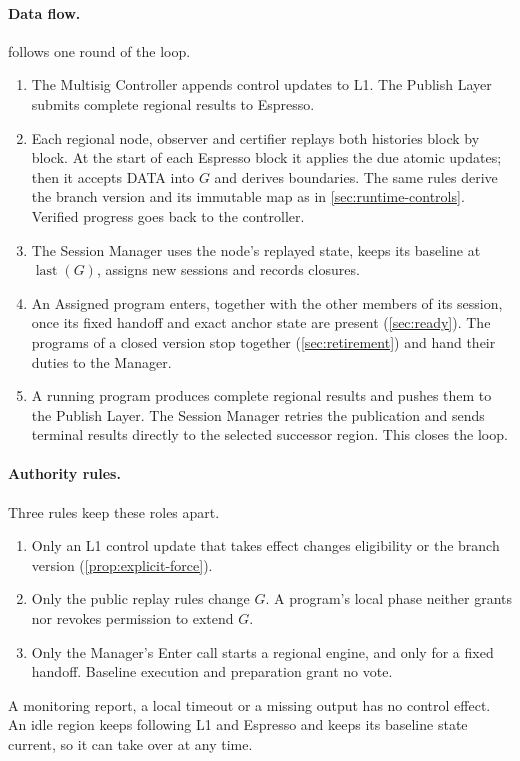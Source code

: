 \documentclass[11pt,a4paper]{article}
\begin{document}
\paragraph{Data flow.}
 follows one round of the loop.
\begin{enumerate}[label=(\arabic*)]
\item The Multisig Controller appends control updates to L1. The Publish
Layer submits complete regional results to Espresso.
\item Each regional node, observer and certifier replays both histories
block by block. At the start of each Espresso block it applies the due
atomic updates; then it accepts DATA into $G$ and derives boundaries.
The same rules derive the branch version and its immutable map as in
\cref{sec:runtime-controls}. Verified progress goes back to the
controller.
\item The Session Manager uses the node's replayed state, keeps its
baseline at $\operatorname{last}(G)$, assigns new sessions and records
closures.
\item An Assigned program enters, together with the other members of
its session, once its fixed handoff and exact anchor state are present
(\cref{sec:ready}). The programs of a closed version stop together
(\cref{sec:retirement}) and hand their duties to the Manager.
\item A running program produces complete regional results and pushes
them to the Publish Layer. The Session Manager retries the publication
and sends terminal results directly to the selected successor region.
This closes the loop.
\end{enumerate}

\paragraph{Authority rules.}
Three rules keep these roles apart.
\begin{enumerate}[label=(A\arabic*)]
\item Only an L1 control update that takes effect changes eligibility or
the branch version (\cref{prop:explicit-force}).
\item Only the public replay rules change $G$. A program's local phase
neither grants nor revokes permission to extend $G$.
\item Only the Manager's Enter call starts a regional engine, and only
for a fixed handoff. Baseline execution and preparation grant no vote.
\end{enumerate}
A monitoring report, a local timeout or a missing output has no control
effect. An idle region keeps following L1 and Espresso and keeps its
baseline state current, so it can take over at any time.
\end{document}
